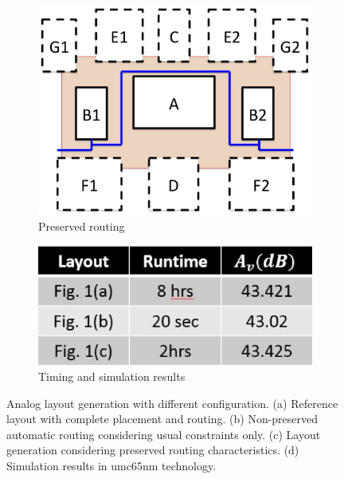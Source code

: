 \begin{figure}
\begin{subfigure}[t]{0.4\textwidth}
        \includegraphics[width=\textwidth]{Fig/RoutingPreserv_c.eps}
        \caption{Preserved routing}
        \label{fig:RoutingPreserv_C}
        \end{subfigure}
        \begin{subfigure}[t]{0.4\textwidth}
        \includegraphics[width=\textwidth]{Fig/RoutingPreserv_d.eps}
        \caption{Timing and simulation results}
        \label{fig:RoutingPreserv_d}
        \end{subfigure}
        \caption{Analog layout generation with different configuration. (a) Reference layout with complete placement and routing. (b) Non-preserved automatic routing considering usual constraints only. (c) Layout generation considering preserved routing characteristics. (d) Simulation results in umc65nm technology.}
        \label{fig:RoutingPreserv}
      \end{figure}

